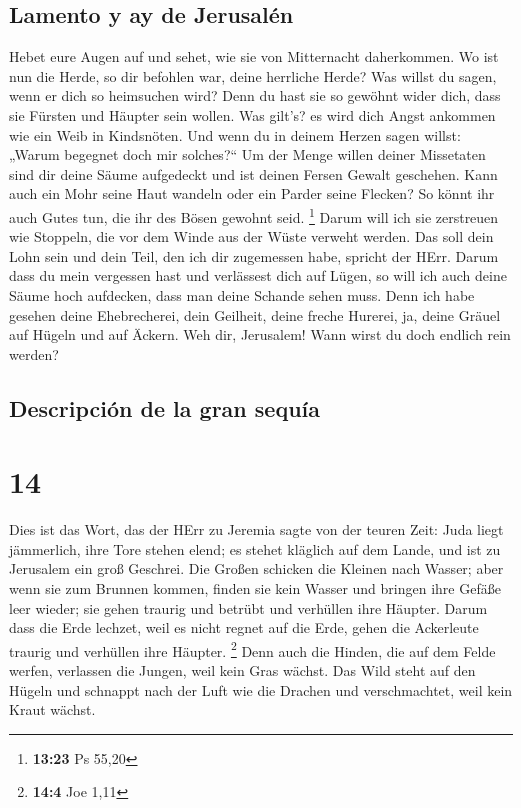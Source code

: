 \hypertarget{lamento-y-ay-de-jerusaluxe9n}{%
\subsection{Lamento y ay de
Jerusalén}\label{lamento-y-ay-de-jerusaluxe9n}}

 Hebet eure Augen auf und sehet, wie sie von Mitternacht
daherkommen. Wo ist nun die Herde, so dir befohlen war, deine herrliche
Herde?  Was willst du sagen, wenn er dich so heimsuchen
wird? Denn du hast sie so gewöhnt wider dich, dass sie Fürsten und
Häupter sein wollen. Was gilt's? es wird dich Angst ankommen wie ein
Weib in Kindsnöten.  Und wenn du in deinem Herzen sagen
willst: „Warum begegnet doch mir solches?{}`` Um der Menge willen deiner
Missetaten sind dir deine Säume aufgedeckt und ist deinen Fersen Gewalt
geschehen.  Kann auch ein Mohr seine Haut wandeln oder
ein Parder seine Flecken? So könnt ihr auch Gutes tun, die ihr des Bösen
gewohnt seid. \footnote{\textbf{13:23} Ps 55,20}  Darum
will ich sie zerstreuen wie Stoppeln, die vor dem Winde aus der Wüste
verweht werden.  Das soll dein Lohn sein und dein Teil,
den ich dir zugemessen habe, spricht der HErr. Darum dass du mein
vergessen hast und verlässest dich auf Lügen,  so will
ich auch deine Säume hoch aufdecken, dass man deine Schande sehen muss.
 Denn ich habe gesehen deine Ehebrecherei, dein Geilheit,
deine freche Hurerei, ja, deine Gräuel auf Hügeln und auf Äckern. Weh
dir, Jerusalem! Wann wirst du doch endlich rein werden?

\hypertarget{descripciuxf3n-de-la-gran-sequuxeda}{%
\subsection{Descripción de la gran
sequía}\label{descripciuxf3n-de-la-gran-sequuxeda}}

\hypertarget{section-13}{%
\section{14}\label{section-13}}

 Dies ist das Wort, das der HErr zu Jeremia sagte von der
teuren Zeit:  Juda liegt jämmerlich, ihre Tore stehen
elend; es stehet kläglich auf dem Lande, und ist zu Jerusalem ein groß
Geschrei.  Die Großen schicken die Kleinen nach Wasser;
aber wenn sie zum Brunnen kommen, finden sie kein Wasser und bringen
ihre Gefäße leer wieder; sie gehen traurig und betrübt und verhüllen
ihre Häupter.  Darum dass die Erde lechzet, weil es nicht
regnet auf die Erde, gehen die Ackerleute traurig und verhüllen ihre
Häupter. \footnote{\textbf{14:4} Joe 1,11}  Denn auch die
Hinden, die auf dem Felde werfen, verlassen die Jungen, weil kein Gras
wächst.  Das Wild steht auf den Hügeln und schnappt nach
der Luft wie die Drachen und verschmachtet, weil kein Kraut wächst.

